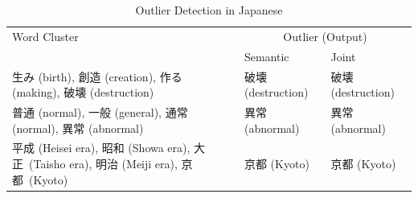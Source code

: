 \begin{table}[h!]
    \centering
    \begin{CJK}{UTF8}{ipxm}
        \begin{tabularx}{\textwidth}{bll}
            \toprule
            \multirow{2.5}{*}{Word Cluster} & \multicolumn{2}{c}{Outlier (Output)} \\
            \cmidrule(lr){2-3} {} & Semantic & Joint \\\midrule
            生み (birth), 創造 (creation), 作る (making), 破壊 (destruction) & \vspace{0.2cm} 破壊 (destruction) & 破壊 (destruction) \\
            普通 (normal), 一般 (general), 通常 (normal), 異常 (abnormal) & \vspace{0.2cm} 異常 (abnormal) & 異常 (abnormal) \\
            \mbox{平成} (Heisei era), \mbox{昭和} (Showa era), \mbox{大正}~(Taisho era), \mbox{明治} (Meiji era), \mbox{京都}~(\mbox{Kyoto}) & 京都 (Kyoto) & 京都 (Kyoto) \\\bottomrule
        \end{tabularx}
    \end{CJK}
    \caption{Outlier Detection in Japanese}
    \label{tab:analysis_outlier2}
\end{table}

